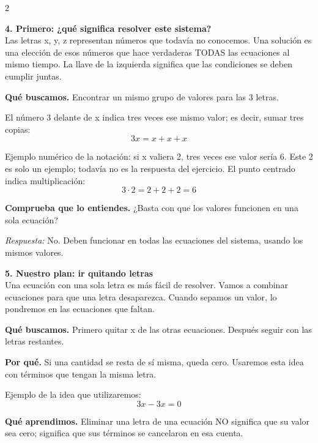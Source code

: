 \documentclass[11pt,a4paper,landscape]{article}
\begin{document}
\begin{multicols*}{2}
\begin{minipage}{\linewidth}
\end{minipage}\par\medskip
\noindent\begin{minipage}{\linewidth}\textbf{4. Primero: ¿qué significa resolver este sistema?}\\[2pt]Las letras x, y, z representan números que todavía no conocemos. Una solución es una elección de esos números que hace verdaderas TODAS las ecuaciones al mismo tiempo. La llave de la izquierda significa que las condiciones se deben cumplir juntas.
\par\smallskip\textbf{Qué buscamos.} Encontrar un mismo grupo de valores para las 3 letras.
\par\smallskip El número 3 delante de x indica tres veces ese mismo valor; es decir, sumar tres copias:
\[3x=x+x+x\]
\par\smallskip Ejemplo numérico de la notación: si x valiera 2, tres veces ese valor sería 6. Este 2 es solo un ejemplo; todavía no es la respuesta del ejercicio. El punto centrado indica multiplicación:
\[3\cdot 2=2+2+2=6\]
\par\smallskip\textbf{Comprueba que lo entiendes.} ¿Basta con que los valores funcionen en una sola ecuación?\par\textit{Respuesta:} No. Deben funcionar en todas las ecuaciones del sistema, usando los mismos valores.
\end{minipage}\par\medskip
\noindent\begin{minipage}{\linewidth}\textbf{5. Nuestro plan: ir quitando letras}\\[2pt]Una ecuación con una sola letra es más fácil de resolver. Vamos a combinar ecuaciones para que una letra desaparezca. Cuando sepamos un valor, lo pondremos en las ecuaciones que faltan.
\par\smallskip\textbf{Qué buscamos.} Primero quitar x de las otras ecuaciones. Después seguir con las letras restantes.
\par\smallskip\textbf{Por qué.} Si una cantidad se resta de sí misma, queda cero. Usaremos esta idea con términos que tengan la misma letra.
\par\smallskip Ejemplo de la idea que utilizaremos:
\[3x-3x=0\]
\par\smallskip\textbf{Qué aprendimos.} Eliminar una letra de una ecuación NO significa que su valor sea cero; significa que sus términos se cancelaron en esa cuenta.
\end{minipage}\par\medskip

\end{multicols*}
\end{document}
